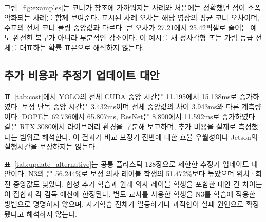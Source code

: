 그림~\ref{fig:examples}는 코너가 참조에 가까워지는 사례와 처음에는 정확했던 점이 소폭 악화되는 사례를 함께 보여준다. 표시된 사례 오차는 해당 영상의 평균 코너 오차이며, 주표의 전체 코너 풀링 중앙값과 다르다. 큰 오차가 27.21에서 25.42픽셀로 줄어든 예도 완전한 복구가 아니라 부분적인 감소이다. 이 예시를 새 정사각형 또는 가림 등급 전체를 대표하는 확률 표본으로 해석하지 않는다.


\subsection{추가 비용과 추정기 업데이트 대안}
표~\ref{tab:cost}에서 YOLO의 전체 CUDA 중앙 시간은 11.195에서 15.138ms로 증가하였다. 보정 단독 중앙 시간은 3.432ms이며 전체 중앙값의 차이 3.943ms와 다른 계측량이다. DOPE는 62.736에서 65.807ms, ResNet은 8.890에서 11.592ms로 증가하였다. 같은 RTX 3080에서 라이브러리 환경을 구분해 보고하며, 추가 비용을 실제로 측정했다는 범위로 해석한다. 이 결과가 비교 보정기 전반에 대한 효율 우월성이나 Jetson의 실행시간을 보장하지는 않는다.


표~\ref{tab:update_alternative}는 공통 플라스틱 128장으로 제한한 추정기 업데이트 대안이다. N3의 \pckten 은 56.244\%로 보정 의사 레이블 학생의 51.472\%보다 높았으며 위치·회전 중앙값도 낮았다. 합성 추가 학습과 원래 의사 레이블 학생을 포함한 대안 간 차이는 이 집합과 각 감독 예산에 한정된다. 별도 교사를 사용한 학생을 N3를 학습에 적용한 방법으로 명명하지 않으며, 자기학습 전체가 열등하거나 과적합이 실패 원인으로 확정됐다고 해석하지 않는다.


